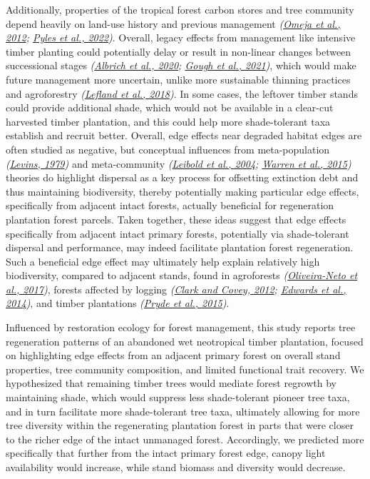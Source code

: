 \documentclass[
  12pt,
]{article}
\begin{document}
Additionally, properties of the tropical forest carbon stores and tree community depend heavily on land-use history and previous management \emph{(\protect\hyperlink{ref-omeja12}{Omeja et al., 2012}; \protect\hyperlink{ref-pyles22}{Pyles et al., 2022})}.
Overall, legacy effects from management like intensive timber planting could potentially delay or result in non-linear changes between successional stages \emph{(\protect\hyperlink{ref-albrich20}{Albrich et al., 2020}; \protect\hyperlink{ref-gough21}{Gough et al., 2021})}, which would make future management more uncertain, unlike more sustainable thinning practices and agroforestry \emph{(\protect\hyperlink{ref-lefland18}{Lefland et al., 2018})}.
In some cases, the leftover timber stands could provide additional shade, which would not be available in a clear-cut harvested timber plantation, and this could help more shade-tolerant taxa establish and recruit better.
Overall, edge effects near degraded habitat edges are often studied as negative, but conceptual influences from meta-population \emph{(\protect\hyperlink{ref-levins79}{Levins, 1979})} and meta-community \emph{(\protect\hyperlink{ref-leibold04}{Leibold et al., 2004}; \protect\hyperlink{ref-warren15}{Warren et al., 2015})} theories do highlight dispersal as a key process for offsetting extinction debt and thus maintaining biodiversity, thereby potentially making particular edge effects, specifically from adjacent intact forests, actually beneficial for regeneration plantation forest parcels.
Taken together, these ideas suggest that edge effects specifically from adjacent intact primary forests, potentially via shade-tolerant dispersal and performance, may indeed facilitate plantation forest regeneration.
Such a beneficial edge effect may ultimately help explain relatively high biodiversity, compared to adjacent stands, found in agroforests \emph{(\protect\hyperlink{ref-oliveira-neto17}{Oliveira-Neto et al., 2017})}, forests affected by logging \emph{(\protect\hyperlink{ref-clark12}{Clark and Covey, 2012}; \protect\hyperlink{ref-edwards14}{Edwards et al., 2014})}, and timber plantations \emph{(\protect\hyperlink{ref-pryde15}{Pryde et al., 2015})}.

Influenced by restoration ecology for forest management, this study reports tree regeneration patterns of an abandoned wet neotropical timber plantation, focused on highlighting edge effects from an adjacent primary forest on overall stand properties, tree community composition, and limited functional trait recovery.
We hypothesized that remaining timber trees would mediate forest regrowth by maintaining shade, which would suppress less shade-tolerant pioneer tree taxa, and in turn facilitate more shade-tolerant tree taxa, ultimately allowing for more tree diversity within the regenerating plantation forest in parts that were closer to the richer edge of the intact unmanaged forest.
Accordingly, we predicted more specifically that further from the intact primary forest edge, canopy light availability would increase, while stand biomass and diversity would decrease.
\end{document}
